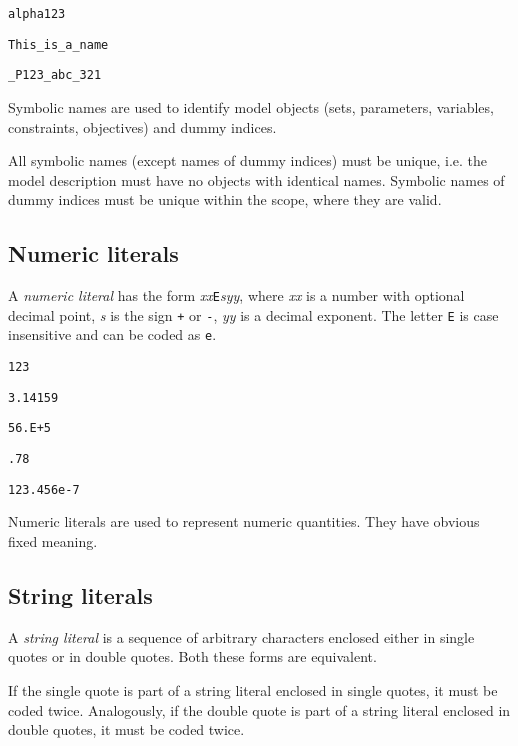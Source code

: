 \documentclass[10pt]{article}
\begin{document}
\medskip


\medskip

\noindent\verb|alpha123|

\noindent\verb|This_is_a_name|

\noindent\verb|_P123_abc_321|

\newpage

Symbolic names are used to identify model objects (sets, parameters,
variables, constraints, objectives) and dummy indices.

All symbolic names (except names of dummy indices) must be unique, i.e.
the model description must have no objects with identical names.
Symbolic names of dummy indices must be unique within the scope, where
they are valid.

\subsection{Numeric literals}

A {\it numeric literal} has the form {\it xx}{\tt E}{\it syy}, where
{\it xx} is a number with optional decimal point, {\it s} is the sign
{\tt+} or {\tt-}, {\it yy} is a decimal exponent. The letter {\tt E} is
case insensitive and can be coded as {\tt e}.

\medskip


\medskip

\noindent\verb|123|

\noindent\verb|3.14159|

\noindent\verb|56.E+5|

\noindent\verb|.78|

\noindent\verb|123.456e-7|

\medskip

Numeric literals are used to represent numeric quantities. They have
obvious fixed meaning.

\subsection{String literals}

A {\it string literal} is a sequence of arbitrary characters enclosed
either in single quotes or in double quotes. Both these forms are
equivalent.

If the single quote is part of a string literal enclosed in single
quotes, it must be coded twice. Analogously, if the double quote is
part of a string literal enclosed in double quotes, it must be coded
twice.
\end{document}
